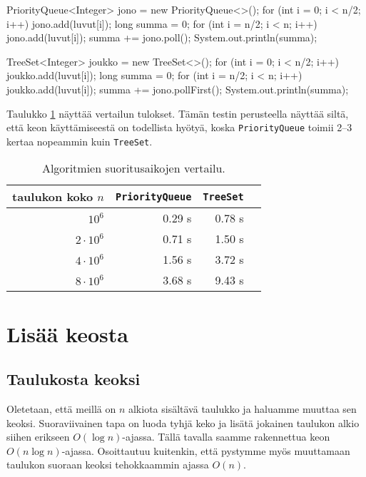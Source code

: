 \begin{code}
PriorityQueue<Integer> jono = new PriorityQueue<>();
for (int i = 0; i < n/2; i++) {
    jono.add(luvut[i]);
}
long summa = 0;
for (int i = n/2; i < n; i++) {
    jono.add(luvut[i]);
    summa += jono.poll();
}
System.out.println(summa);
\end{code}

\begin{code}
TreeSet<Integer> joukko = new TreeSet<>();
for (int i = 0; i < n/2; i++) {
    joukko.add(luvut[i]);
}
long summa = 0;
for (int i = n/2; i < n; i++) {
    joukko.add(luvut[i]);
    summa += jono.pollFirst();
}
System.out.println(summa);
\end{code}

Taulukko \ref{tab:kekver} näyttää vertailun tulokset.
Tämän testin perusteella näyttää siltä,
että keon käyttämiseestä on todellista hyötyä,
koska \texttt{PriorityQueue} toimii 2–3
kertaa nopeammin kuin \texttt{TreeSet}.

\begin{table}
\center
\begin{tabular}{rrrr}
taulukon koko $n$ & \texttt{PriorityQueue} & \texttt{TreeSet} \\
\hline
$10^6$ & 0.29 s & 0.78 s \\
$2 \cdot 10^6$ & 0.71 s & 1.50 s \\
$4 \cdot 10^6$ & 1.56 s & 3.72 s \\
$8 \cdot 10^6$ & 3.68 s & 9.43 s \\
\end{tabular}
\caption{Algoritmien suoritusaikojen vertailu.}
\label{tab:kekver}
\end{table}

\section{Lisää keosta}

\subsection{Taulukosta keoksi}

Oletetaan, että meillä on $n$ alkiota sisältävä taulukko
ja haluamme muuttaa sen keoksi.
Suoraviivainen tapa on luoda tyhjä keko ja
lisätä jokainen taulukon alkio siihen erikseen $O(\log n)$-ajassa.
Tällä tavalla saamme rakennettua keon $O(n \log n)$-ajassa.
Osoittautuu kuitenkin, että pystymme myös muuttamaan taulukon
suoraan keoksi tehokkaammin ajassa $O(n)$.


